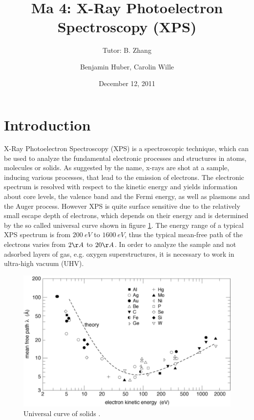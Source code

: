 \documentclass[a4paper]{scrartcl}
\title{Ma 4: X-Ray Photoelectron Spectroscopy (XPS)}
\subtitle{Tutor: B. Zhang}
\author{Benjamin Huber, Carolin Wille}
\date{December 12, 2011}
\numberwithin{equation}{section}
\numberwithin{figure}{section}
\numberwithin{table}{section}
\begin{document}
\thispagestyle{empty}
\maketitle
\tableofcontents
\clearpage


\section{Introduction}
X-Ray Photoelectron Spectroscopy (XPS) is a spectroscopic technique, which can be used to analyze the fundamental electronic processes and structures in atoms, molecules or solids. As suggested by the name, x-rays are shot at a sample, inducing various processes, that lead to the emission of electrons. The electronic spectrum is resolved with respect to the kinetic energy and yields information about core levels, the valence band and the Fermi energy, as well as plasmons and the Auger process. However XPS is quite surface sensitive due to the relatively small escape depth of electrons, which depends on their energy and is determined by the so called universal curve shown in figure \ref{fig:uni}. The energy range of a typical XPS spectrum is from $\SI{200}{eV}$ to $\SI{1600}{eV}$, thus the typical mean-free path of the electrons varies from $2 \AA $ to $20 \AA$. In order to analyze the sample and not adsorbed layers of gas, e.g. oxygen superstructures, it is necessary to work in ultra-high vacuum (UHV).
\begin{figure}
  \centering
   	\includegraphics[width=\linewidth]{img/meanfree.pdf}
 \caption{\small Universal curve of solids \cite{zangwill}.  }
        \label{fig:uni}
\end{figure}


\FloatBarrier
\end{document}
